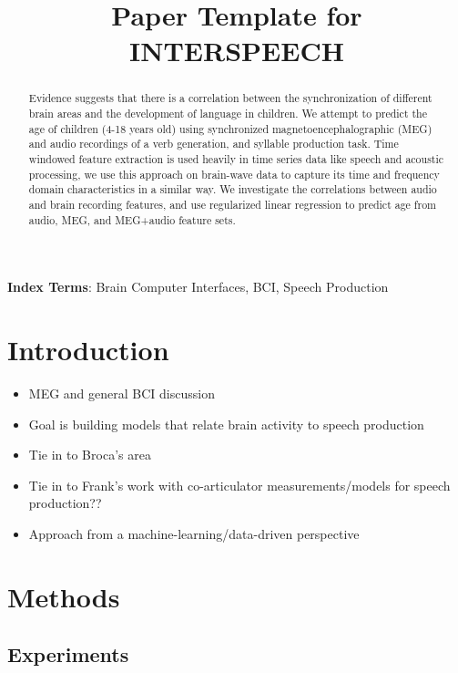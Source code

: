\documentclass[a4paper]{article}
\title{Paper Template for INTERSPEECH}
\begin{document}
\maketitle
% 
\begin{abstract}

Evidence suggests that there is a correlation between the synchronization of different brain areas and the development of language in children. We attempt to predict the age of children (4-18 years old) using synchronized magnetoencephalographic (MEG) and audio recordings of a verb generation, and syllable production task.
Time windowed feature extraction is used heavily in time series data like speech and acoustic processing, we use this approach on brain-wave data to capture its time and frequency domain characteristics in a similar way. We investigate the correlations between audio and brain recording features, and use regularized linear regression to predict age from audio, MEG, and MEG+audio feature sets.
  
\end{abstract}


\noindent\textbf{Index Terms}: Brain Computer Interfaces, BCI, Speech Production

\section{Introduction}

\begin{itemize}
\item MEG and general BCI discussion
\item Goal is building models that relate brain activity to speech production
\item Tie in to Broca's area
\item Tie in to Frank's work with co-articulator measurements/models for speech production??
\item Approach from a machine-learning/data-driven perspective
\end{itemize}  

\section{Methods}


\subsection{Experiments}
\end{document}
